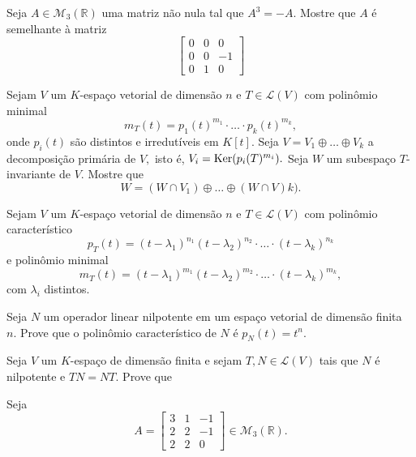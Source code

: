 \documentclass[11pt,a4paper]{article}
\begin{document}
    \solucao{}
  
   Seja $A \in \mathcal{M}_3(\mathbb{R})$ uma matriz não nula tal que $A^3 = −A.$ Mostre que $A$ é semelhante à matriz
  \[
  \begin{bmatrix}
  0 & 0 & 0 \\
  0 & 0 & -1 \\
  0 & 1 & 0
  \end{bmatrix}
  \]
  
      \solucao{}
  
   Sejam $V$ um $K$-espaço vetorial de dimensão $n$ e $T \in \mathcal{L}(V)$ com polinômio minimal
\[m_T(t) = p_1(t)^{m_1} \cdot \ldots \cdot p_k(t)^{m_k}, \]
onde $p_i(t)$ são distintos e irredutíveis em $K[t].$ Seja $V = V_1 \oplus \ldots \oplus V_k$ a decomposição primária de $V,$ isto é, $V_i = {\rm Ker}(p_i(T)^{m_i}).$ Seja $W$ um subespaço $T$-invariante de $V.$ Mostre que
\[W = (W \cap V_1) \oplus \ldots \oplus (W \cap V)k).
\]
      \solucao{}
  
   Sejam $V$ um $K$-espaço vetorial de dimensão $n$ e $T \in \mathcal{L}(V)$ com polinômio característico
  \[
p_T(t) = (t − \lambda_1)^{n_1} (t −\lambda_2)^{n_2} \cdot \ldots \cdot  (t − \lambda_k)^{n_k}\]
e polinômio minimal
\[m_T(t) = (t − \lambda_1)^{m_1} (t −\lambda_2)^{m_2} \cdot \ldots \cdot  (t − \lambda_k)^{m_k}, \]
com $\lambda_i$ distintos.
        
     \solucao{}
  
    Seja $N$ um operador linear nilpotente em um espaço vetorial de dimensão finita $n.$ Prove que o polinômio característico de $N$ é $p_N(t) = t^n.$
  
      \solucao{}
  
   Seja $V$ um $K$-espaço de dimensão finita e sejam $T, N \in \mathcal{L}(V)$ tais que $N$ é nilpotente e $TN = NT.$ Prove que
      \solucao{}
  
   Seja
  \[
  A = \begin{bmatrix}
  3 & 1 & -1 \\
  2 & 2 & -1 \\
  2 & 2 & 0
  \end{bmatrix} \in \mathcal{M}_3(\mathbb{R}).
  \]
 
\end{document}
